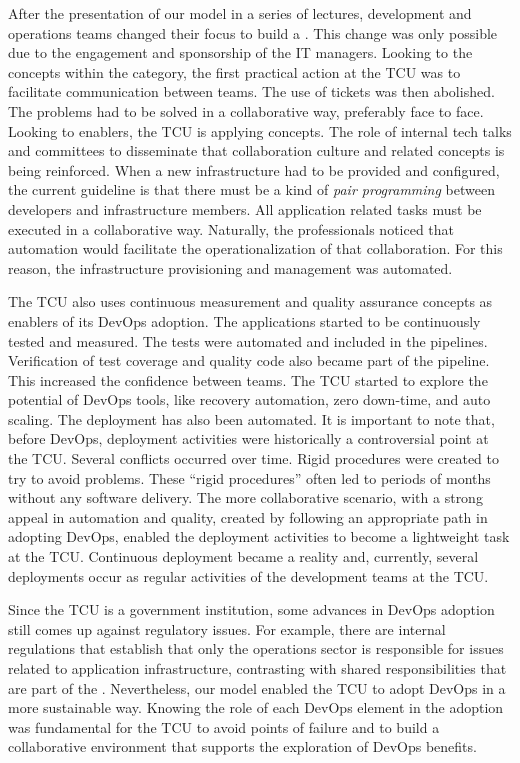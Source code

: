 After the presentation of our  model in a series of lectures, development and
operations teams changed their focus to build a \cc. This
change was only possible due to the engagement and sponsorship of the IT
managers. Looking to the concepts within the \cc category, the first practical
action at the TCU was to facilitate communication between teams. The use of tickets
was then abolished. The problems had to be solved in a collaborative way, preferably
face to face.
Looking to enablers, the TCU is applying  concepts.
The role of internal tech talks and committees to disseminate that collaboration
culture and related concepts is being reinforced.
When a new infrastructure had to be provided and configured, the current guideline is
that there must be a kind of \emph{pair programming} between developers and infrastructure
members. All application related tasks must be executed in a collaborative
way. Naturally, the professionals noticed that automation would facilitate the
operationalization of that collaboration. For this reason, the infrastructure provisioning
and management was automated.

The TCU also uses continuous measurement and quality assurance concepts as
enablers of its DevOps adoption. The applications started to be continuously
tested and measured. The tests were automated and included in the pipelines.
Verification of test coverage and quality code also became part of the pipeline.
This increased the confidence between teams. The TCU started
to explore the potential of DevOps tools, like recovery automation, zero
down-time, and auto scaling. The deployment has also been automated.
It is important to note that, before DevOps, deployment activities were historically a controversial point at the TCU.
Several conflicts occurred over time. Rigid procedures were created to try to
avoid problems. These ``rigid procedures'' often led to periods of months
without any software delivery. The more collaborative scenario, with a strong appeal in automation and quality,
created by following an appropriate path in adopting DevOps, enabled the deployment activities to become
a lightweight task at the TCU. Continuous deployment became a reality and, currently, several deployments
occur as regular activities of the development teams at the TCU.

Since the TCU is a government institution, some advances in DevOps adoption still comes up
against regulatory issues. For example, there are internal regulations that
establish that only the operations sector is responsible for issues related to
application infrastructure, contrasting with shared responsibilities that are
part of the \cc. Nevertheless, our model enabled the TCU to adopt DevOps in a more
sustainable way. Knowing the role
of each DevOps element in the adoption was fundamental for the TCU to avoid points
of failure and to build a collaborative environment that supports the
exploration of DevOps benefits.
